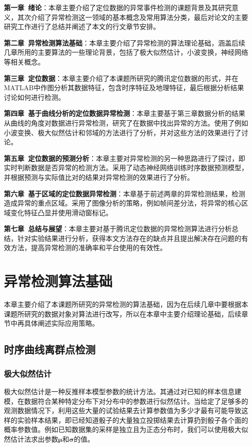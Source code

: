 \documentclass[a4paper,AutoFakeBold,oneside,12pt]{book}
\begin{document}
\begin{description}
\item \textbf{第一章\ 绪论}：本章主要介绍了定位数据的异常事件检测的课题背景及其研究意义，其次介绍了异常检测这一领域的基本概念及常用算法分类，最后对论文的主要研究工作进行了总结并阐述了本文的行文章节安排。
\item \textbf{第二章\ 异常检测算法基础}：本章主要介绍了异常检测的算法理论基础，涵盖后续几章所用的主要算法的一些理论背景，包括了极大似然估计，小波变换，神经网络等相关概念。
\item \textbf{第三章\ 定位数据}：本章主要介绍了本课题所研究的腾讯定位数据的形式，并在MATLAB中作图分析其数据特征，包含时序特征及地理特征，最后根据分析结果讨论如何进行检测。
\item \textbf{第四章\ 基于曲线分析的定位数据异常检测}：本章主要基于第三章数据分析的结果从曲线的角度对数据进行异常检测，研究了在数据中找出异常的方法。使用了例如小波变换、极大似然估计和邻域的方法进行了分析，并对这些方法的效果进行了讨论。
\item \textbf{第五章\ 定位数据的预测分析}：本章主要对异常检测的另一种思路进行了探讨，即实时判断数据是否异常的检测方法。采用了动态神经网络训练时序数据预测模型，并根据预测与实际值比对的结果对异常检测的效果进行了分析。
\item \textbf{第六章\ 基于区域的定位数据异常检测}：本章基于前述两章的异常检测结果，检测造成异常的重点区域。采用了图像分析的策略，例如帧间差分法，将异常的核心区域变化特征凸显并使用滑动窗标记。
\item \textbf{第七章\ 总结与展望}：本章主要对基于腾讯定位数据的异常检测算法进行分析总结，针对实验结果进行分析，获得本文方法存在的缺点并且提出解决存在问题的有效方法，提高异常检测的准确率和平台使用的有效性。
\end{description}


\chapter{异常检测算法基础}
本章主要介绍了本课题所研究的异常检测的算法基础，因为在后续几章中要根据本课题所研究的数据对象对算法进行改写，所以在本章中主要介绍理论基础，后续章节中再具体阐述实际应用策略。


\section{时序曲线离群点检测}
\subsection{极大似然估计}
	极大似然估计是一种反推样本模型参数的统计方法\cite{dempster1977maximum}。其通过对已知的样本信息建模，在数据符合某种特定分布下对分布中的参数进行似然估计。当给定了足够多的观测数据情况下，利用这些大量的试验结果去计算参数值为多少才最有可能导致这样的实验样本结果，即已经知道骰子的大量独立投掷结果去计算扔到骰子各个面的概率参数值。例如已知数据集的采样是独立且为正态分布时，我们可以使用极大似然估计法求出参数$\bm{\mu}$和$\bm{\sigma}$的值。
\end{document}
